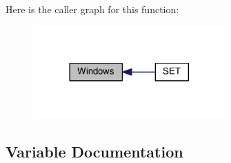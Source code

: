 Here is the caller graph for this function\+:
\nopagebreak
\begin{figure}[H]
\begin{center}
\leavevmode
\includegraphics[width=209pt]{README_8txt_a82d177673b61f20bcd964ce31b5f71c2_icgraph}
\end{center}
\end{figure}




\subsection{Variable Documentation}

